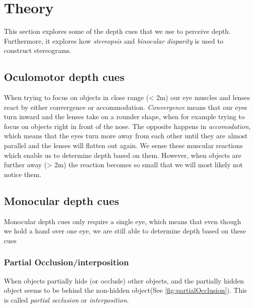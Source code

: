 \section{Theory}
This section explores some of the depth cues that we use to perceive depth. Furthermore, it explores how \textit{stereopsis} and \textit{binocular disparity} is used to construct stereograms.

\subsection{Oculomotor depth cues}
When trying to focus on objects in close range (< 2m) our eye muscles and lenses react by either convergence or accommodation. \textit{Convergence} means that our eyes turn inward and the lenses take on a rounder shape, when for example trying to focus on objects right in front of the nose. The opposite happens in \textit{accomodation}, which means that the eyes turn more away from each other until they are almost parallel and the lenses will flatten out again. We sense these muscular reactions which enable us to determine depth based on them. However, when objects are further away (> 2m) the reaction becomes so small that we will most likely not notice them\citep[p.~196]{sensationPerception}.

\subsection{Monocular depth cues}
Monocular depth cues only require a single eye, which means that even though we hold a hand over one eye, we are still able to determine depth based on these cues\citep[p.~197]{sensationPerception}

\subsubsection{Partial Occlusion/interposition}
When objects partially hide (or occlude) other objects, and the partially hidden object seems to be behind the non-hidden object(See \autoref{fig:partialOcclusion}). This is called \textit{partial occlusion} or \textit{interposition}\citep[p.~197]{sensationPerception}.

